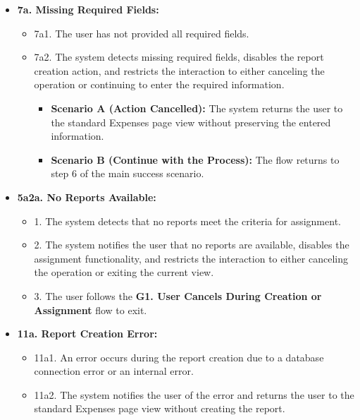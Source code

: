 \begin{itemize} [label={}, leftmargin=0.75cm, noitemsep]
    \item \textbf{7a. Missing Required Fields:}
    \begin{itemize} [label={}, leftmargin=0.75cm, noitemsep]
        \item 7a1. The user has not provided all required fields.
        \item 7a2. The system detects missing required fields, disables the report creation action, and restricts the interaction to either canceling the operation or continuing to enter the required information.
        \begin{itemize} [label={}, leftmargin=0.75cm, noitemsep]
           \item \textbf{Scenario A (Action Cancelled):} The system returns the user to the standard Expenses page view without preserving the entered information.
            \item \textbf{Scenario B (Continue with the Process):} The flow returns to step 6 of the main success scenario.
        \end{itemize}
        
    \end{itemize}

    \item \textbf{5a2a. No Reports Available:}
    \begin{itemize} [label={}, leftmargin=0.75cm, noitemsep]
        \item 1. The system detects that no reports meet the criteria for assignment.
        \item 2. The system notifies the user that no reports are available, disables the assignment functionality, and restricts the interaction to either canceling the operation or exiting the current view.
        \item 3. The user follows the \textbf{G1. User Cancels During Creation or Assignment} flow to exit.
    \end{itemize}

    \item \textbf{11a. Report Creation Error:}
    \begin{itemize} [label={}, leftmargin=0.75cm, noitemsep]
        \item 11a1. An error occurs during the report creation due to a database connection error or an internal error.
        \item 11a2. The system notifies the user of the error and returns the user to the standard Expenses page view without creating the report.
    \end{itemize}


\end{itemize}
